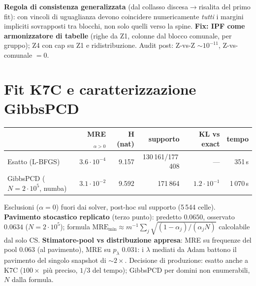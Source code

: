 \documentclass[11pt,a4paper]{article}
\begin{document}
\medskip\noindent\textbf{Regola di consistenza generalizzata} (dal collasso
discesa$\to$risalita del primo fit): con vincoli di uguaglianza devono
coincidere numericamente \emph{tutti} i margini impliciti sovrapposti tra
blocchi, non solo quelli verso la spine. \textbf{Fix: IPF come armonizzatore
di tabelle} (righe da Z1, colonne dal blocco comunale, per gruppo); Z4 con
cap su Z1 e ridistribuzione. Audit post: Z-vs-Z $\sim10^{-11}$,
Z-vs-comunale $=0$.

\section{Fit K7C e caratterizzazione GibbsPCD}
\begin{center}
\small
\begin{tabular}{@{}lrrrrr@{}}
\toprule
 & \textbf{MRE}$_{\alpha>0}$ & \textbf{H (nat)} & \textbf{supporto} & \textbf{KL vs exact} & \textbf{tempo}\\
\midrule
Esatto (L-BFGS) & $3.6\cdot10^{-4}$ & 9.157 & 130\,161/177\,408 & --- & 351\,s\\
GibbsPCD ($N{=}2\cdot10^5$, numba) & $3.1\cdot10^{-2}$ & 9.592 & 171\,864 & $1.2\cdot10^{-1}$ & 1\,070\,s\\
\bottomrule
\end{tabular}
\end{center}
Esclusioni ($\alpha=0$) fuori dai solver, post-hoc sul supporto (5\,544
celle). \textbf{Pavimento stocastico replicato} (terzo punto):
predetto $0.0650$, osservato $0.0634$ ($N=2\cdot10^5$); formula
$\text{MRE}_{\min}\approx m^{-1}\sum_j\sqrt{(1-\alpha_j)/(\alpha_j N)}$
calcolabile dal solo CS. \textbf{Stimatore-pool vs distribuzione appresa}:
MRE su frequenze del pool $0.063$ (al pavimento), MRE su $p_\lambda$
$0.031$: i $\lambda$ mediati da Adam battono il pavimento del singolo
snapshot di $\sim2\times$. Decisione di produzione: esatto anche a K7C
($100\times$ pi\`u preciso, $1/3$ del tempo); GibbsPCD per domini non
enumerabili, $N$ dalla formula.

\end{document}

